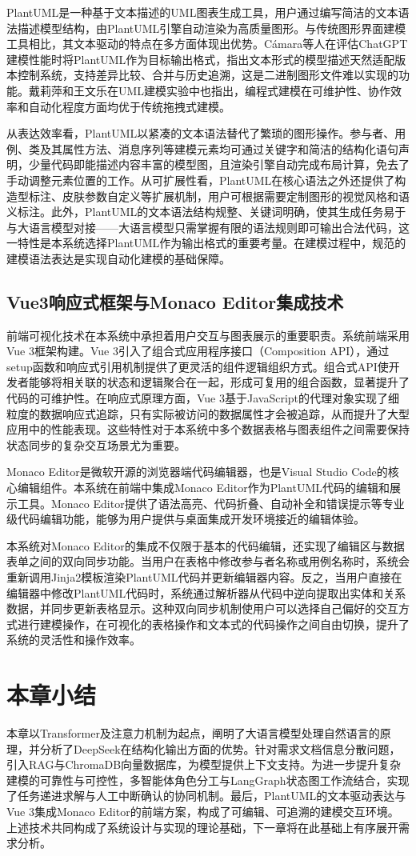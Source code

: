 PlantUML是一种基于文本描述的UML图表生成工具，用户通过编写简洁的文本语法描述模型结构，由PlantUML引擎自动渲染为高质量图形。与传统图形界面建模工具相比，其文本驱动的特点在多方面体现出优势。Cámara等人\cite{camara2023assessment}在评估ChatGPT建模性能时将PlantUML作为目标输出格式，指出文本形式的模型描述天然适配版本控制系统，支持差异比较、合并与历史追溯，这是二进制图形文件难以实现的功能。戴莉萍和王文乐\cite{dailiping2021}在UML建模实验中也指出，编程式建模在可维护性、协作效率和自动化程度方面均优于传统拖拽式建模。

从表达效率看，PlantUML以紧凑的文本语法替代了繁琐的图形操作。参与者、用例、类及其属性方法、消息序列等建模元素均可通过关键字和简洁的结构化语句声明，少量代码即能描述内容丰富的模型图，且渲染引擎自动完成布局计算，免去了手动调整元素位置的工作。从可扩展性看，PlantUML在核心语法之外还提供了构造型标注、皮肤参数自定义等扩展机制，用户可根据需要定制图形的视觉风格和语义标注。此外，PlantUML的文本语法结构规整、关键词明确，使其生成任务易于与大语言模型对接——大语言模型只需掌握有限的语法规则即可输出合法代码，这一特性是本系统选择PlantUML作为输出格式的重要考量。在建模过程中，规范的建模语法表达是实现自动化建模的基础保障。

\subsection{Vue3响应式框架与Monaco Editor集成技术}

前端可视化技术在本系统中承担着用户交互与图表展示的重要职责。系统前端采用Vue 3框架构建。Vue 3引入了组合式应用程序接口（Composition API），通过setup函数和响应式引用机制提供了更灵活的组件逻辑组织方式。组合式API使开发者能够将相关联的状态和逻辑聚合在一起，形成可复用的组合函数，显著提升了代码的可维护性。在响应式原理方面，Vue 3基于JavaScript的代理对象实现了细粒度的数据响应式追踪，只有实际被访问的数据属性才会被追踪，从而提升了大型应用中的性能表现。这些特性对于本系统中多个数据表格与图表组件之间需要保持状态同步的复杂交互场景尤为重要。

Monaco Editor是微软开源的浏览器端代码编辑器，也是Visual Studio Code的核心编辑组件。本系统在前端中集成Monaco Editor作为PlantUML代码的编辑和展示工具。Monaco Editor提供了语法高亮、代码折叠、自动补全和错误提示等专业级代码编辑功能，能够为用户提供与桌面集成开发环境接近的编辑体验。

本系统对Monaco Editor的集成不仅限于基本的代码编辑，还实现了编辑区与数据表单之间的双向同步功能。当用户在表格中修改参与者名称或用例名称时，系统会重新调用Jinja2模板渲染PlantUML代码并更新编辑器内容。反之，当用户直接在编辑器中修改PlantUML代码时，系统通过解析器从代码中逆向提取出实体和关系数据，并同步更新表格显示。这种双向同步机制使用户可以选择自己偏好的交互方式进行建模操作，在可视化的表格操作和文本式的代码操作之间自由切换，提升了系统的灵活性和操作效率。

\section{本章小结}

本章以Transformer及注意力机制为起点，阐明了大语言模型处理自然语言的原理，并分析了DeepSeek在结构化输出方面的优势。针对需求文档信息分散问题，引入RAG与ChromaDB向量数据库，为模型提供上下文支持。为进一步提升复杂建模的可靠性与可控性，多智能体角色分工与LangGraph状态图工作流结合，实现了任务递进求解与人工中断确认的协同机制。最后，PlantUML的文本驱动表达与Vue 3集成Monaco Editor的前端方案，构成了可编辑、可追溯的建模交互环境。上述技术共同构成了系统设计与实现的理论基础，下一章将在此基础上有序展开需求分析。